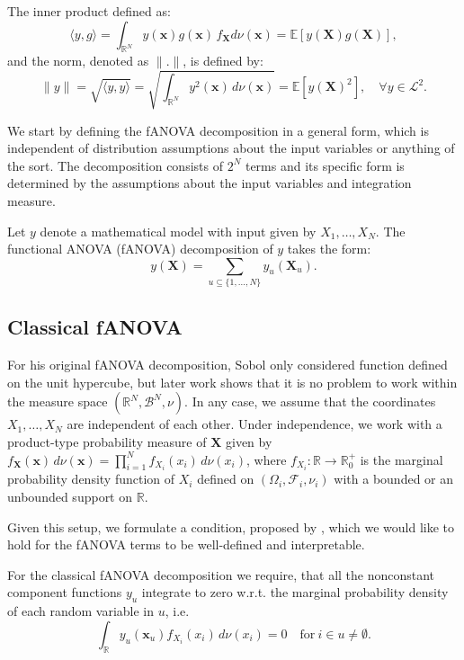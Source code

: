 The inner product defined as:
\[
\langle y, g \rangle = \int_{\mathbb{R}^N} y(\boldsymbol{x}) g(\boldsymbol{x}) \, f_{\boldsymbol{X}}d\nu(\boldsymbol{x}) = \mathbb{E}[y(\boldsymbol{X})g(\boldsymbol{X})],
\]
and the norm, denoted as $\|.\|$, is defined by:
\[
\|y\| = \sqrt{\langle y, y \rangle} = \sqrt{\int_{\mathbb{R}^N} y^2(\boldsymbol{x}) \, d\nu(\boldsymbol{x})} = \mathbb{E}[y(\boldsymbol{X})^2], \quad \forall y \in \mathcal{L}^2.
\]

We start by defining the fANOVA decomposition in a general form, which is independent of distribution assumptions about the input variables or anything of the sort. The decomposition consists of $2^N$ terms and its specific form is determined by the assumptions about the input variables and integration measure.

\begin{definition}
Let $y$  denote a mathematical model with input given by $X_1, \dots, X_N$. The functional ANOVA (fANOVA) decomposition of $y$ takes the form:
\begin{equation}
    y(\boldsymbol{X}) = \sum_{u \subseteq \{1, \dots, N\}} y_{u}(\boldsymbol{X}_u).
    \label{eq:fanova_decomposition}
\end{equation}
\end{definition}


\subsection{Classical fANOVA}
For his original fANOVA decomposition, Sobol only considered function defined on the unit hypercube, but later work shows that it is no problem to work within the measure space $(\mathbb{R}^N, \mathcal{B}^N, \nu)$.
In any case, we assume that the coordinates $X_1, \dots , X_N$ are independent of each other.
Under independence, we work with a product-type probability measure of $\boldsymbol{X}$ given by \(f_{\boldsymbol{X}}(\boldsymbol{x}) \, d\nu(\boldsymbol{x}) = \prod_{i=1}^{N} f_{X_i}(x_i) \, d\nu(x_i)\), where \(f_{X_i}: \mathbb{R} \rightarrow \mathbb{R}_{0}^{+}\) is the marginal probability density function of \(X_i\) defined on $(\Omega_i, \mathcal{F}_i, \nu_i)$ with a bounded or an unbounded support on $\mathbb{R}$.

Given this setup, we formulate a condition, proposed by \cite{rahman2014}, which we would like to hold for the fANOVA terms to be well-defined and interpretable.
\begin{condition}
    For the classical fANOVA decomposition we require, that all the nonconstant component functions $y_u$ integrate to zero w.r.t. the marginal probability density of each random variable in $u$, i.e.
\begin{equation}
    \int_{\mathbb{R}} y_u(\boldsymbol{x}_u) f_{X_i}(x_i) \, d\nu(x_i) = 0 \quad \text{for} \ i \in u \neq \emptyset.
    \label{eq:strong_annihilating_conditions}
\end{equation}
\label{cond:strong_annihilating_conditions}
\end{condition}

